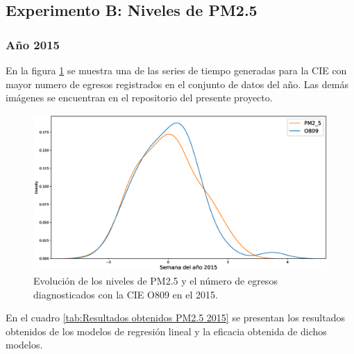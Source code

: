 

\subsection{Experimento B: Niveles de PM2.5}

\subsubsection{Año 2015}
En la figura \ref{serie_de_tiempo_2015_PM25} se muestra una de las series de tiempo generadas para la CIE \citep{r9} con mayor numero de egresos registrados en el conjunto de datos del año. Las demás imágenes se encuentran en el repositorio del presente proyecto.

\begin{figure}[h!]
\setcounter{figure}{1} %
\captionsetup{type=figure} %
\begin{center}
   \includegraphics[width=1\textwidth]{PM2_5_O809_2015.eps}
   \end{center}
    \caption[Series de tiempo 2015 PM2.5 Y O809]{Evolución de los niveles de PM2.5 y el número de egresos diagnosticados con la CIE O809 en el 2015.}
    \label{serie_de_tiempo_2015_PM25}
\end{figure}

En el cuadro \ref{tab:Resultados obtenidos PM2.5 2015} se presentan los resultados obtenidos de los modelos de regresión lineal y la eficacia obtenida de dichos modelos. 

